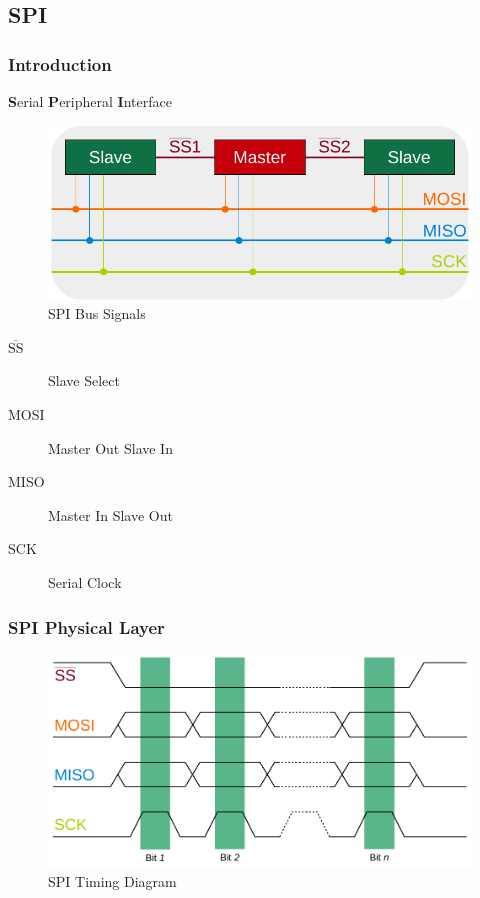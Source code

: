 \documentclass{beamer}
\renewcommand{\emph}[1]{\textbf{\textcolor{greeniot2}{#1}}}
\begin{document}
\subsection{SPI}

\begin{frame}
  \frametitle{Introduction}
  
  \emph{S}erial \emph{P}eripheral \emph{I}nterface
  
  \begin{figure}[H]
    \includegraphics[width=.7\textwidth]{images/spi-bus.pdf}
    \caption{SPI Bus Signals}
  \end{figure}
  
  \begin{description}
    \item[$\overline{\text{SS}}$] Slave Select
    \item[MOSI] Master Out Slave In
    \item[MISO] Master In Slave Out
    \item[SCK] Serial Clock
  \end{description}
\end{frame}

\begin{frame}
  \frametitle{SPI Physical Layer}

  \begin{figure}[H]
    \includegraphics[width=.85\textwidth]{images/spi-timing.pdf}
    \caption{SPI Timing Diagram}
  \end{figure}
\end{frame}
\end{document}
